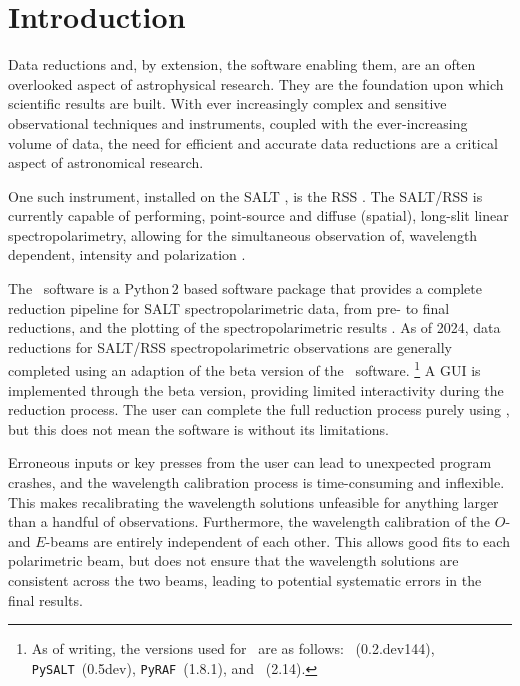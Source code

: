 \chapter{Introduction} \label{ch:01}

Data reductions and, by extension, the software enabling them, are an often overlooked aspect of astrophysical research.
They are the foundation upon which scientific results are built.
With ever increasingly complex and sensitive observational techniques and instruments, coupled with the ever-increasing volume of data, the need for efficient and accurate data reductions are a critical aspect of astronomical research.

One such instrument, installed on the \gls{SALT} \citep{SALT_design}, is the \gls{RSS} \citep{SALT_optical_design}.
The \gls{SALT}/\gls{RSS} is currently capable of performing, point-source and diffuse (spatial), long-slit linear spectropolarimetry, allowing for the simultaneous observation of, wavelength dependent, intensity and polarization \citep{SALT_hires}.

The \polsalt\ software is a Python\,$2$ based software package that provides a complete reduction pipeline for \gls{SALT} spectro\-polarimetric data, from pre- to final reductions, and the plotting of the spectro\-polarimetric results \citep{polsalt}.
As of 2024, data reductions for \gls{SALT}/\gls{RSS} spectropolarimetric observations are generally completed using an adaption of the beta version of the \polsalt\ software.%
\footnote{As of writing, the versions used for \polsalt\ are as follows: \polsalt~(0.2.dev144), \texttt{PySALT}~(0.5dev), \texttt{PyRAF}~(1.8.1), and ~(2.14).}
A \gls{GUI} is implemented through the beta version, providing limited interactivity during the reduction process.
The user can complete the full reduction process purely using \polsalt, but this does not mean the software is without its limitations.

Erroneous inputs or key presses from the user can lead to unexpected program crashes, and the wavelength calibration process is time-consuming and inflexible.
This makes recalibrating the wavelength solutions unfeasible for anything larger than a handful of observations.
Furthermore, the wavelength calibration of the $O$- and $E$-beams are entirely independent of each other.
This allows good fits to each polarimetric beam, but does not ensure that the wavelength solutions are consistent across the two beams, leading to potential systematic errors in the final results.

